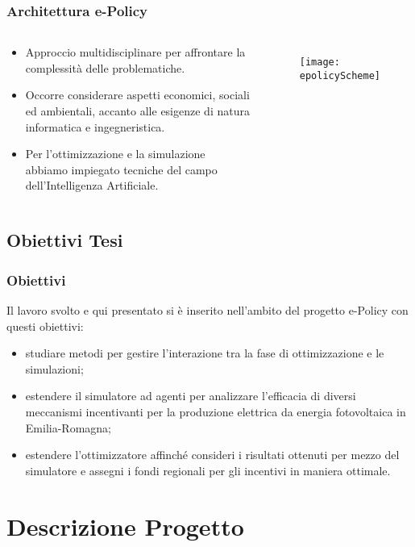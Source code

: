 \documentclass{beamer}
\begin{document}
	\begin{frame}
		\frametitle{Architettura e-Policy}
		\begin{columns}
		\begin{block}{}
			\begin{itemize}
				\item Approccio multidisciplinare per affrontare la complessità delle problematiche.
				\item Occorre considerare aspetti economici, sociali ed ambientali, accanto alle esigenze di natura informatica e ingegneristica.
				\item Per l'ottimizzazione e la simulazione abbiamo impiegato tecniche del campo dell'Intelligenza Artificiale.
			\end{itemize}
		\end{block}

			\begin{figure}[hbt]
				\centering
				\texttt{[image: epolicyScheme]}
			\label{epolicyScheme}
		\end{figure}
		\end{columns}
  	\end{frame}
	
\subsection{Obiettivi Tesi}
	\begin{frame}
		\frametitle{Obiettivi}
		Il lavoro svolto e qui presentato si è inserito nell'ambito del progetto e-Policy con questi obiettivi:
		\begin{itemize}
			\item[\checkmark] studiare metodi per gestire l'interazione tra la fase di ottimizzazione e le simulazioni;
			\item[\checkmark] estendere il simulatore ad agenti per analizzare l'efficacia di diversi meccanismi incentivanti per la produzione elettrica da energia fotovoltaica in Emilia-Romagna;
			\item[\checkmark] estendere l'ottimizzatore affinché consideri i risultati ottenuti per mezzo del simulatore e assegni i fondi regionali per gli incentivi in maniera ottimale.
		\end{itemize}	
	\end{frame}
  
  
\section{Descrizione Progetto}
  	
\end{document}
